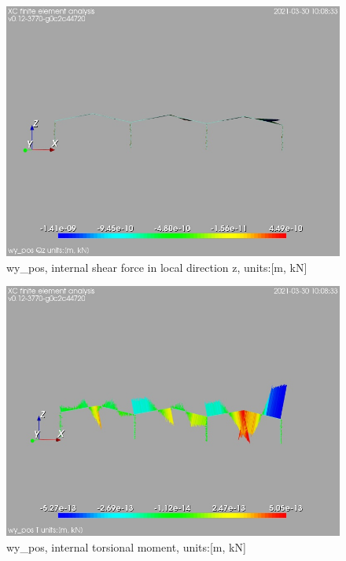 \begin{figure}
\begin{center}
\includegraphics[width=\linewidth]{calc_results/sole_zeinali/text/graphics/resSimplLC/wy_posallMemberSetQz}
\caption{wy_pos, internal shear force in local direction z, units:[m, kN]}
\end{center}
\end{figure}
\begin{figure}
\begin{center}
\includegraphics[width=\linewidth]{calc_results/sole_zeinali/text/graphics/resSimplLC/wy_posallMemberSetT}
\caption{wy_pos, internal torsional moment, units:[m, kN]}
\end{center}
\end{figure}
